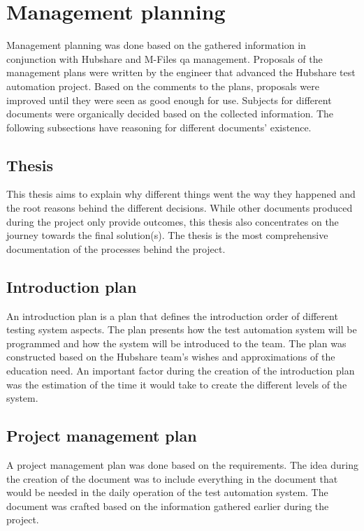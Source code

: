 \section{Management planning}
Management planning was done based on the gathered information in conjunction with Hubshare and M-Files \gls{qa} management. Proposals of the management plans were written by the engineer that advanced the Hubshare test automation project. Based on the comments to the plans, proposals were improved until they were seen as good enough for use. Subjects for different documents were organically decided based on the collected information. The following subsections have reasoning for different documents' existence.

\subsection{Thesis}
This thesis aims to explain why different things went the way they happened and the root reasons behind the different decisions. While other documents produced during the project only provide outcomes, this thesis also concentrates on the journey towards the final solution(s). The thesis is the most comprehensive documentation of the processes behind the project.

\subsection{Introduction plan}
An introduction plan is a plan that defines the introduction order of different testing system aspects. The plan presents how the test automation system will be programmed and how the system will be introduced to the team. The plan was constructed based on the Hubshare team's wishes and approximations of the education need. An important factor during the creation of the introduction plan was the estimation of the time it would take to create the different levels of the system.

\subsection{Project management plan}
A project management plan was done based on the requirements. The idea during the creation of the document was to include everything in the document that would be needed in the daily operation of the test automation system. The document was crafted based on the information gathered earlier during the project.

